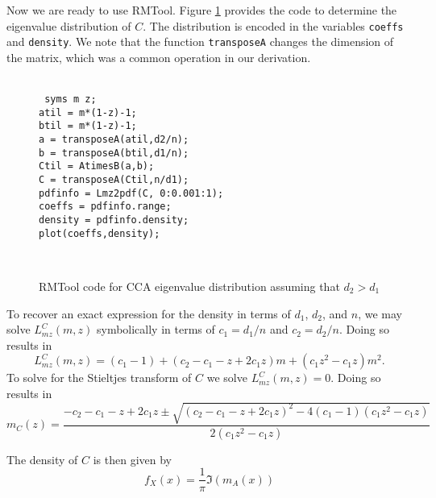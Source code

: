 Now we are ready to use RMTool. Figure \ref{fig:cca_rmtool} provides the {}
code to determine the eigenvalue distribution of $C$. The distribution is encoded in the
variables \texttt{coeffs} and \texttt{density}. We note that the function
\texttt{transposeA} changes the dimension of the matrix, which was a common operation in
our derivation.

\begin{figure}        
  \hrulefill\\
  \texttt{
    syms m z;\\        
    atil = m*(1-z)-1;\\
    btil = m*(1-z)-1;\\
    a = transposeA(atil,d2/n);\\
    b = transposeA(btil,d1/n);\\
    Ctil = AtimesB(a,b);\\
    C = transposeA(Ctil,n/d1);\\
    pdfinfo = Lmz2pdf(C, 0:0.001:1);\\
    coeffs = pdfinfo.range;\\
    density = pdfinfo.density;\\
    plot(coeffs,density);\\        
  }      
  \caption{RMTool {} code for CCA eigenvalue distribution assuming that
    $d_2>d_1$}
  \label{fig:cca_rmtool}
  \hrulefill \\
\end{figure}

To recover an exact expression for the density in terms of $d_1$, $d_2$, and $n$, we may
solve $L_{mz}^C(m,z)$ symbolically in terms of $c_1 = d_1/n$ and $c_2 = d_2/n$. Doing so
results in 
\begin{equation}
  L_{mz}^C(m,z) = (c_1-1) + (c_2-c_1 -z +2c_1z)m + (c_1z^2-c_1z)m^2.
\end{equation}
To solve for the Stieltjes transform of $C$ we solve $L_{mz}^C(m,z)=0$. Doing so results
in
\begin{equation}\label{eq:cca_st}
  m_C(z) = \frac{-c_2-c_1-z+2c_1z \pm \sqrt{(c_2-c_1-z+2c_1z)^2-4(c_1-1)(c_1z^2-c_1z)}}{2(c_1z^2-c_1z)}
\end{equation}

The density of $C$ is then given by
\begin{equation}
f_X(x) = \frac{1}{\pi}\Im(m_A(x))
\end{equation}

